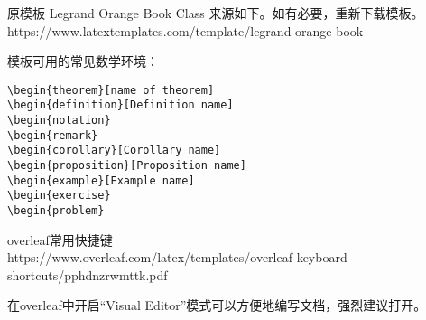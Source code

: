 \documentclass{article}
\begin{document}
\begin{CJK*}{UTF8}{gbsn}


原模板 Legrand Orange Book Class 来源如下。如有必要，重新下载模板。\\
https://www.latextemplates.com/template/legrand-orange-book

模板可用的常见数学环境：
\begin{verbatim}
\begin{theorem}[name of theorem]
\begin{definition}[Definition name]
\begin{notation}
\begin{remark}
\begin{corollary}[Corollary name]
\begin{proposition}[Proposition name]
\begin{example}[Example name]
\begin{exercise}
\begin{problem}
\end{verbatim}

overleaf常用快捷键 \\
https://www.overleaf.com/latex/templates/overleaf-keyboard-shortcuts/pphdnzrwmttk.pdf

在overleaf中开启“Visual Editor”模式可以方便地编写文档，强烈建议打开。














\end{CJK*}
\end{document}
